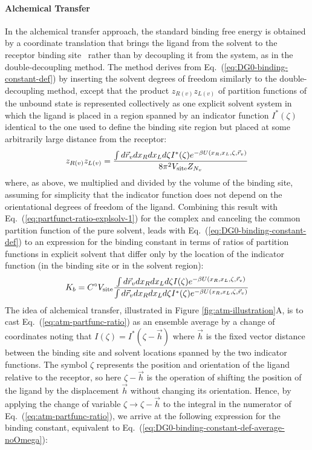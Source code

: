\documentclass[9pt,bestpractices]{livecoms}
\begin{document}
\paragraph{Alchemical Transfer}

In the alchemical transfer approach, the standard binding free energy is obtained by a coordinate translation that brings the ligand from the solvent to the receptor binding site~\cite{wu2021alchemical} rather than by decoupling it from the system, as in the double-decoupling method. The method derives from Eq.~(\ref{eq:DG0-binding-constant-def}) by inserting the solvent degrees of freedom similarly to the double-decoupling method, except that the product $z_{R(v)} z_{L(v)}$ of partition functions of the unbound state is represented collectively as one explicit solvent system in which the ligand is placed in a region spanned by an indicator function $I^\ast(\zeta)$ identical to the one used to define the binding site region but placed at some arbitrarily large distance from the receptor:
\begin{equation}
  z_{R(v)} z_{L(v)} =
  \frac{
    \int d\vec{r}_v dx_R dx_L d\zeta I^\ast(\zeta) e^{-\beta U(x_R, x_L, \zeta, \vec{r}_v)}
  }{
    8 \pi^2 V_{\rm site} Z_{N_v}
  }
\end{equation}
where, as above, we multiplied and divided by the volume of the binding site, assuming for simplicity that the indicator function does not depend on the orientational degrees of freedom of the ligand. Combining this result with Eq.~(\ref{eq:partfunct-ratio-explsolv-1}) for the complex and canceling the common partition function of the pure solvent, leads with Eq.~(\ref{eq:DG0-binding-constant-def})  to an expression for the binding constant in terms of ratios of partition functions in explicit solvent that differ only by the location of the indicator function (in the binding site or in the solvent region):
\begin{equation}\label{eq:atm-partfunc-ratio}
  K_b = C^\circ V_{\rm site} \frac{
    \int d\vec{r}_v dx_R dx_L d\zeta I(\zeta) e^{-\beta U(x_R, x_L, \zeta, \vec{r}_v)}
  }{
    \int d\vec{r}_v dx_R dx_L d\zeta I^\ast(\zeta) e^{-\beta U(x_R, x_L, \zeta, \vec{r}_v)}
  }
\end{equation}
The idea of alchemical transfer, illustrated in Figure \ref{fig:atm-illustration}A, is to cast Eq.~(\ref{eq:atm-partfunc-ratio}) as an ensemble average by a change of coordinates noting that $I(\zeta) = I^\ast(\zeta - \vec{h})$ where $\vec{h}$ is the fixed vector distance between the binding site and solvent locations spanned by the two indicator functions. The symbol $\zeta$ represents the position and orientation of the ligand relative to the receptor, so here $\zeta - \vec{h}$ is the operation of shifting the position of the ligand by the displacement $\vec{h}$ without changing its orientation. Hence, by applying the change of variable $\zeta \rightarrow \zeta - \vec{h}$ to the integral in the numerator of Eq.~(\ref{eq:atm-partfunc-ratio}), we arrive at the following expression for the binding constant, equivalent to Eq.~(\ref{eq:DG0-binding-constant-def-average-noOmega}):
\end{document}
